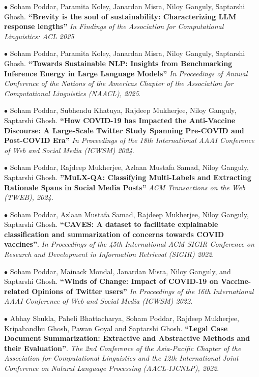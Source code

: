 \documentclass[paper=a4,fontsize=10pt]{scrartcl} %
\newcommand{\sepspace}{\vspace*{0.6em}}		%
\begin{document}
{
\small
    \noindent $\bullet$ Soham Poddar, Paramita Koley, Janardan Misra, Niloy Ganguly, Saptarshi Ghosh. 
    \textbf{``Brevity is the soul of sustainability: Characterizing LLM response lengths''} 
    \textit{In Findings of the Association for Computational Linguistics: ACL 2025}
    \sepspace
    
    \noindent $\bullet$ Soham Poddar, Paramita Koley, Janardan Misra, Niloy Ganguly, Saptarshi Ghosh. \textbf{``Towards Sustainable NLP: Insights from Benchmarking Inference Energy in Large Language Models''} \textit{In Proceedings of Annual Conference of the Nations of the Americas Chapter of the Association for Computational Linguistics (NAACL), 2025}. \sepspace


    \noindent $\bullet$ Soham Poddar, Subhendu Khatuya, Rajdeep Mukherjee, Niloy Ganguly, Saptarshi Ghosh. \textbf{``How COVID-19 has Impacted the Anti-Vaccine Discourse: A Large-Scale Twitter Study Spanning Pre-COVID and Post-COVID Era''} \textit{In Proceedings of the 18th International AAAI Conference of Web and Social Media (ICWSM) 2024}. \sepspace

    \noindent $\bullet$ Soham Poddar, Rajdeep Mukherjee, Azlaan Mustafa Samad, Niloy Ganguly, Saptarshi Ghosh. \textbf{''MuLX-QA: Classifying Multi-Labels and Extracting Rationale Spans in Social Media Posts''} \textit{ACM Transactions on the Web (TWEB), 2024.} \sepspace


    \newpage

    \noindent $\bullet$ Soham Poddar, Azlaan Mustafa Samad, Rajdeep Mukherjee, Niloy Ganguly, Saptarshi Ghosh. \textbf{``CAVES: A dataset to facilitate explainable classification and summarization of concerns towards COVID vaccines''}. \textit{In Proceedings of the 45th International ACM SIGIR Conference on Research and Development in Information Retrieval (SIGIR) 2022}. 
    \sepspace
    
    \noindent $\bullet$ Soham Poddar, Mainack Mondal, Janardan Misra, Niloy Ganguly, and Saptarshi Ghosh. \textbf{``Winds of Change: Impact of COVID-19 on Vaccine-related Opinions of Twitter users''} \textit{In Proceedings of the 16th International AAAI Conference of Web and Social Media (ICWSM) 2022}. \sepspace


    \noindent $\bullet$ Abhay Shukla, Paheli Bhattacharya, Soham Poddar, Rajdeep Mukherjee, Kripabandhu Ghosh, Pawan Goyal and Saptarshi Ghosh. \textbf{``Legal Case Document Summarization: Extractive and Abstractive Methods and their Evaluation''}. \textit{The 2nd Conference of the Asia-Pacific Chapter of the Association for Computational Linguistics and the 12th International Joint Conference on Natural Language Processing (AACL-IJCNLP), 2022}. \sepspace

}
\end{document}
